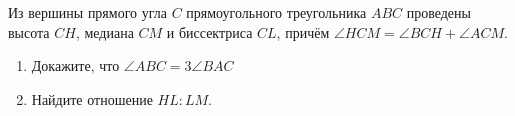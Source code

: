 \begin{ex}
	\begin{condition}
		Из вершины прямого угла \( C  \) прямоугольного треугольника \( ABC  \) проведены высота \( CH \), медиана \( CM  \) и биссектриса \( CL \), причём \( \angle HCM=\angle BCH +\angle ACM \).
		\begin{enumerate}
			\item Докажите, что \( \angle ABC =3\angle BAC \)
			\item Найдите отношение \( HL : LM \).
		\end{enumerate}
	\end{condition}
\end{ex}